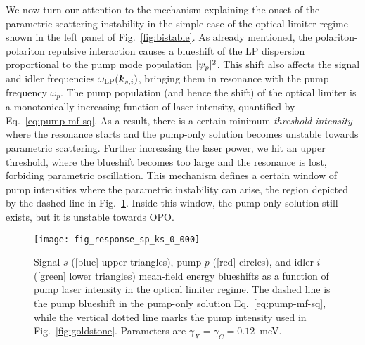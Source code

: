 We now turn our attention to the mechanism explaining the onset of the
parametric scattering instability in the simple case of the optical
limiter regime shown in the left panel of Fig.~\ref{fig:bistable}. As
already mentioned, the polariton-polariton repulsive interaction
causes a blueshift of the LP dispersion proportional to the pump mode
population $\vert \psi_p \vert^2$. This shift also affects the signal and
idler frequencies $\omega_{\text{LP}}(\bm{k}_{s,i})$, bringing them in
resonance with the pump frequency $\omega_p$. The pump population (and
hence the shift) of the optical limiter is a monotonically increasing
function of laser intensity, quantified by
Eq.~\eqref{eq:pump-mf-sq}. As a result, there is a certain minimum
\textit{threshold intensity} where the resonance starts and the
pump-only solution becomes unstable towards parametric
scattering. Further increasing the laser power, we hit an upper
threshold, where the blueshift becomes too large and the resonance is
lost, forbiding parametric oscillation. This mechanism defines a
certain window of pump intensities where the parametric instability
can arise, the region depicted by the dashed line in
Fig.~\ref{fig:spi}. Inside this window, the pump-only solution still
exists, but it is unstable towards OPO.
%
\begin{figure}[tb]\centering
  \texttt{[image: fig\_response\_sp\_ks\_0\_000]}
  \caption{
    Signal $s$ ([blue] upper triangles), pump $p$ ([red] circles), and
    idler $i$ ([green] lower triangles) mean-field energy blueshifts as a
    function of pump laser intensity in the optical limiter regime. The
    dashed line is the pump blueshift in the pump-only solution
    Eq.~\eqref{eq:pump-mf-sq}, while the vertical dotted line marks the
    pump intensity used in Fig.~\ref{fig:goldstone}. Parameters are
    $\gamma_X = \gamma_C = 0.12$~meV.
  }\label{fig:spi}
\end{figure}
% 

